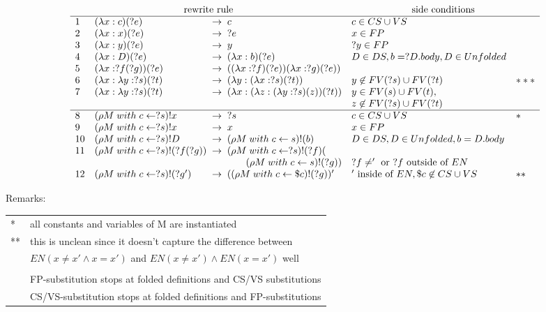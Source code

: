 \documentclass[a4paper]{article}
\begin{document}
\[
\begin{array}{ll@{\;\;\rightarrow\;\;}lll}
\\
  \multicolumn{3}{c}{$rewrite rule$}
  & \multicolumn{2}{c}{$side conditions$} \\
  \hline
  1&  (\lambda x : c)(?e) &  c & c \in CS \cup VS & \\
  2&  (\lambda x : x)(?e) &  ?e & x \in FP &\\
  3&  (\lambda x : y)(?e) &  y & ?y \in FP&\\
  4&  (\lambda x : D)(?e) &  (\lambda x : b)(?e) & D \in DS, b = ?D.body,
                                                   D \in Unfolded&\\
  5&  (\lambda x : ?f(?g))(?e) & ((\lambda x : ?f)(?e))(\lambda x : ?g)(?e)) &\\
  6&  (\lambda x : \lambda y : ?s)(?t)
   & (\lambda y : (\lambda x : ?s)(?t))
                          & y \not \in FV(?s) \cup FV(?t) & ***\\
  7&  (\lambda x : \lambda y : ?s)(?t)
   & (\lambda x : (\lambda z : (\lambda y : ?s)(z))(?t))
                          & y \in FV(s) \cup FV(t) , \\
  \multicolumn{3}{l}{} & z \not \in FV(?s) \cup FV(?t) & \\
  \hline
  8&  (\rho M\; with\; c \leftarrow ?s)!x & ?s & c \in CS \cup VS & * \\
  9&  (\rho M\; with\; c \leftarrow ?s)!x & x & x \in FP &\\
  10&  (\rho M\; with\; c \leftarrow ?s)!D & (\rho M\; with\; c \leftarrow s)!(b)
                          & D\in DS, D \in Unfolded, b = D.body&\\
  11 &  (\rho M\; with\; c \leftarrow ?s)!(?f(?g))
   & (\rho M\; with\; c \leftarrow ?s)!(?f)(\\
  \multicolumn{3}{r}{  (\rho M\; with\; c \leftarrow s)!(?g) )}
  & ?f \neq '\mbox{ or }?f\mbox{ outside of }EN  &\\
  12&  (\rho M\; with\; c \leftarrow ?s)!(?g')
   & ((\rho M\; with\; c \leftarrow \$c)!(?g) )'
                          & '\mbox{ inside of }EN, \$c \not \in CS\cup VS  &**\\
\end{array}
\]

Remarks:\\
\begin{tabular}{ll}
  * & all constants and variables of M are instantiated \\
  ** & this is unclean since it doesn't capture the difference between \\
     &  $EN (x\neq x' \land x=x')$ and $EN (x\neq x') \land EN (x=x')$ well\\
  \\
  & FP-substitution stops at folded definitions and CS/VS substitutions\\
  & CS/VS-substitution stops at folded definitions and FP-substitutions\\
\end{tabular}
\end{document}
